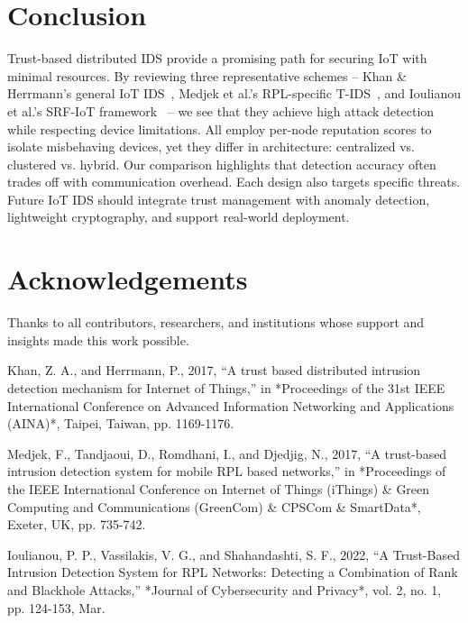 \documentclass[final,5p,times,twocolumn]{elsarticle}
\begin{document}
\section{Conclusion}
Trust-based distributed IDS provide a promising path for securing IoT with minimal resources. By reviewing three representative schemes – Khan \& Herrmann’s general IoT IDS~\cite{Khan2017}, Medjek et al.’s RPL-specific T-IDS~\cite{Medjek2017}, and Ioulianou et al.’s SRF-IoT framework~\cite{Ioulianou2022} – we see that they achieve high attack detection while respecting device limitations. All employ per-node reputation scores to isolate misbehaving devices, yet they differ in architecture: centralized vs. clustered vs. hybrid. Our comparison highlights that detection accuracy often trades off with communication overhead. Each design also targets specific threats. Future IoT IDS should integrate trust management with anomaly detection, lightweight cryptography, and support real-world deployment.

\section*{Acknowledgements}
Thanks to all contributors, researchers, and institutions whose support and insights made this work possible. 

\begin{thebibliography}{00}

Khan, Z. A., and Herrmann, P., 2017, “A trust based distributed intrusion detection mechanism for Internet of Things,” in *Proceedings of the 31st IEEE International Conference on Advanced Information Networking and Applications (AINA)*, Taipei, Taiwan, pp. 1169-1176.

Medjek, F., Tandjaoui, D., Romdhani, I., and Djedjig, N., 2017, “A trust-based intrusion detection system for mobile RPL based networks,” in *Proceedings of the IEEE International Conference on Internet of Things (iThings) \& Green Computing and Communications (GreenCom) \& CPSCom \& SmartData*, Exeter, UK, pp. 735-742.

Ioulianou, P. P., Vassilakis, V. G., and Shahandashti, S. F., 2022, “A Trust-Based Intrusion Detection System for RPL Networks: Detecting a Combination of Rank and Blackhole Attacks,” *Journal of Cybersecurity and Privacy*, vol. 2, no. 1, pp. 124-153, Mar.

\end{thebibliography}
\end{document}
